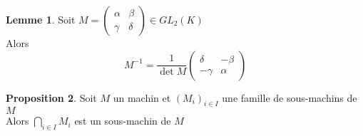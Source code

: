 \documentclass[10pt,a4paper]{article}
\theoremstyle{definition}
\newtheorem{proposition}{Proposition}[section]
\newtheorem{lemme}[proposition]{Lemme}
\begin{document}
\begin{lemme}
Soit $M = \begin{pmatrix}
\alpha & \beta \\
\gamma & \delta
\end{pmatrix} \in GL_2(K)$ \\
Alors
\[ M^{-1} = \frac{1}{\det M} \begin{pmatrix}
\delta & - \beta \\
- \gamma & \alpha
\end{pmatrix}\]
\end{lemme}
\begin{proposition}
Soit $M$ un machin \footnotemark[1] et $(M_i)_{i \in I}$ une famille de sous-machins de $M$ \\
Alors $\bigcap\limits_{i \in I} M_i$ est un sous-machin de $M$
\end{proposition}
\end{document}

